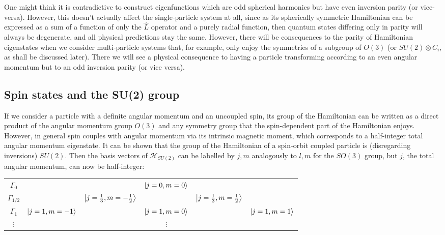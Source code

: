 \documentclass[12pt]{article}
\begin{document}
	One might think it is contradictive to construct eigenfunctions which are odd spherical harmonics but have even inversion parity (or vice-versa). However, this doesn't actually affect the single-particle system at all, since as its spherically symmetric Hamiltonian can be expressed as a sum of a function of only the $\hat{L}$ operator and a purely radial function, then quantum states differing only in parity will always be degenerate, and all physical predictions stay the same. However, there will be consequences to the parity of Hamiltonian eigenstates when we consider multi-particle systems that, for example, only enjoy the symmetries of a subgroup of $O(3)$ (or $SU(2)\otimes C_i$, as shall be discussed later). There we will see a physical consequence to having a particle transforming according to an even angular momentum but to an odd inversion parity (or vice versa).
	
	\subsection{Spin states and the SU(2) group}
	
	If we consider a particle with a definite angular momentum and an uncoupled spin, its group of the Hamiltonian can be written as a direct product of the angular momentum group $O(3)$ and any symmetry group that the spin-dependent part of the Hamiltonian enjoys. However, in general spin couples with angular momentum via its intrinsic magnetic moment, which corresponds to a half-integer total angular momentum eigenstate. It can be shown that the group of the Hamiltonian of a spin-orbit coupled particle is (disregarding inversions) $SU(2)$. Then the basis vectors of $\mathcal{H}_{SU(2)}$ can be labelled by $j,m$ analogously to $l,m$ for the $SO(3)$ group, but $j$, the total angular momentum, can now be half-integer:
	
	\begin{center}
	\begin{tabular}{c|c c c c c}
	$\Gamma_0$ & & & $\ket{j=0, m=0}$ & &\\
	$\Gamma_{1/2}$ & & $\ket{j=\frac{1}{3},m=-\frac{1}{2}}$ & & $\ket{j=\frac{1}{3},m=\frac{1}{2}}$ &\\
	$\Gamma_1$ & $\ket{j=1,m=-1}$ & & $\ket{j=1,m=0}$ & & $\ket{j=1,m=1}$\\
	$\vdots$ & & & $\vdots$ & &
	\end{tabular}
	\end{center}
	
\end{document}
